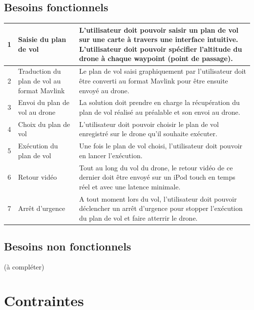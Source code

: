 \documentclass{article}
\begin{document}
	\subsection{Besoins fonctionnels}
	    \begin{center}
        \begin{tabularx}{15cm}{|c|p{4cm}|X|}
            \hline
            1 & Saisie du plan de vol & L'utilisateur doit pouvoir saisir un plan de vol sur une carte à travers une interface intuitive. L'utilisateur doit pouvoir spécifier l'altitude du drone à chaque waypoint (point de passage).\\
            \hline
            2 & Traduction du plan de vol au format Mavlink & Le plan de vol saisi graphiquement par l'utilisateur doit être converti au format Mavlink pour être ensuite envoyé au drone.\\
            \hline
            3 & Envoi du plan de vol au drone & La solution doit prendre en charge la récupération du plan de vol réalisé au préalable et son envoi au drone. \\
            \hline
            4 & Choix du plan de vol  & L'utilisateur doit pouvoir choisir le plan de vol enregistré sur le drone qu'il souhaite exécuter. \\
            \hline
            5 & Exécution du plan de vol  & Une fois le plan de vol choisi, l'utilisateur doit pouvoir en lancer l'exécution. \\
            \hline
            6 & Retour vidéo  & Tout au long du vol du drone, le retour vidéo de ce dernier doit être envoyé sur un iPod touch en temps réel et avec une latence minimale. \\
            \hline
            7 & Arrêt d'urgence  & A tout moment lors du vol, l'utilisateur doit pouvoir déclencher un arrêt d'urgence pour stopper l'exécution du plan de vol et faire atterrir le drone. \\
            \hline
        \end{tabularx}
        \end{center}
	\subsection{Besoins non fonctionnels}
	(à compléter)\\
\section{Contraintes}
\end{document}
